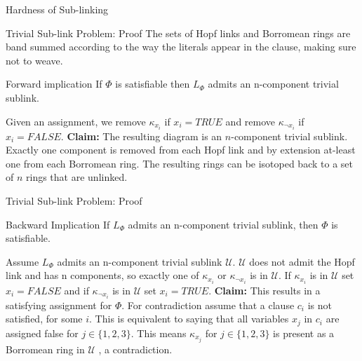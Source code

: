 \documentclass{beamer}
\begin{document}
\begin{section}{Hardness of Sub-linking}
\begin{frame}{Trivial Sub-link Problem: Proof}
        The sets of Hopf links and Borromean rings are band summed according to the way the literals appear in the clause, making sure not to weave.  
        \begin{block}{Forward implication}
            If $\Phi$ is satisfiable then $L_\Phi$ admits an n-component trivial sublink.
        \end{block}{}
        Given an assignment, we remove $\kappa_{x_i}$ if $x_i=TRUE$ and remove $\kappa_{\neg x_i}$ if $x_i=FALSE$.
        \newline
        \newline
        \textbf{Claim:} The resulting diagram is an $n$-component trivial sublink.
        \newline
        \newline
        Exactly one component is removed from each Hopf link and by extension at-least one from each Borromean ring. The resulting rings can be isotoped back to a set of $n$ rings that are unlinked. 
\end{frame}{}
    
\begin{frame}{Trivial Sub-link Problem: Proof}
        \begin{block}{Backward Implication}
            If $L_\Phi$ admits an n-component trivial sublink, then $\Phi$ is satisfiable.
        \end{block}{}
        Assume $L_\Phi$ admits an n-component trivial sublink $\mathcal{U}$. $\mathcal{U}$ does not admit the Hopf link and has n components, so exactly one of $\kappa_{x_i}$ or $\kappa_{\neg x_i}$ is in $\mathcal{U}$. 
        \newline
        \newline
        If $\kappa_{x_i}$ is in $\mathcal{U}$ set $x_i=FALSE$ and if $\kappa_{\neg x_i}$ is in $\mathcal{U}$ set $x_i=TRUE$. 
        \newline
        \newline
        \textbf{Claim:} This results in a satisfying assignment for $\Phi$. 
        \newline
        \newline
        For contradiction assume that a clause $c_i$ is not satisfied, for some $i$. This is equivalent to saying that all variables $x_j$ in $c_i$ are assigned false for $j \in \{1,2,3\}$. This means $\kappa_{x_j}$ for $j\in \{1,2,3\}$ is present as a Borromean ring in $\mathcal{U}$ , a contradiction.   
    
\end{frame}{}

\end{section}
\end{document}
